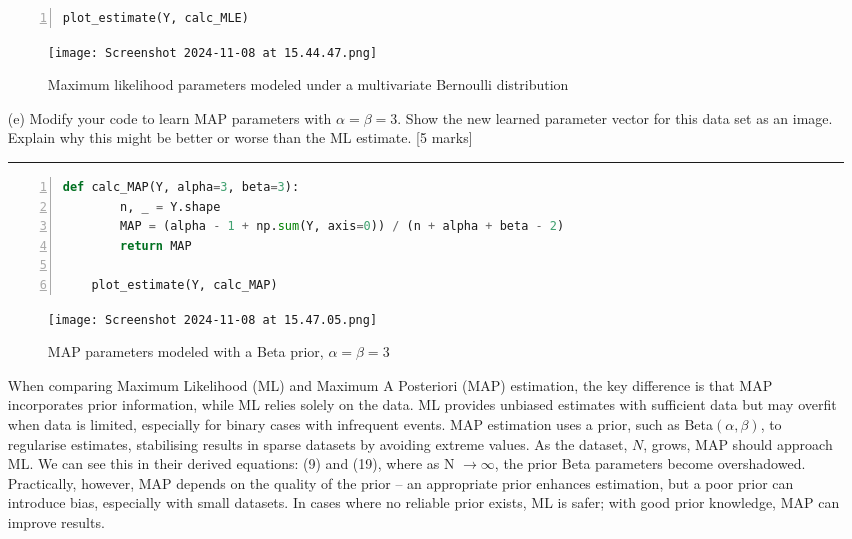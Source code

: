 \documentclass{article}
\begin{document}
\begin{enumerate}
\begin{lstlisting}[language=Python, numbers=left, frame=single, breaklines=true]
    plot_estimate(Y, calc_MLE)
    \end{lstlisting}



    \begin{figure}[H]
        \centering
        \texttt{[image: Screenshot 2024-11-08 at 15.44.47.png]}
        \caption{Maximum likelihood parameters modeled under a multivariate Bernoulli distribution}
        \label{fig:enter-label}
    \end{figure}

    \item[(e)] Modify your code to learn MAP parameters with $\alpha = \beta = 3$. Show the new learned parameter vector for this data set as an image. Explain why this might be better or worse than the ML estimate. [5 marks]

    \noindent\textcolor{gray}{\rule{0.1\linewidth}{0.4pt}}

    \vspace{10pt}


    \begin{lstlisting}[language=Python, numbers=left, frame=single, breaklines=true]
    def calc_MAP(Y, alpha=3, beta=3):
        n, _ = Y.shape
        MAP = (alpha - 1 + np.sum(Y, axis=0)) / (n + alpha + beta - 2)
        return MAP
    
    plot_estimate(Y, calc_MAP)
    \end{lstlisting}


    
    \begin{figure}[H]
        \centering
        \texttt{[image: Screenshot 2024-11-08 at 15.47.05.png]}
        \caption{MAP parameters modeled with a Beta prior, $\alpha = \beta = 3$}
        \label{fig:enter-label}
    \end{figure}

    When comparing Maximum Likelihood (ML) and Maximum A Posteriori (MAP) estimation, the key difference is that MAP incorporates prior information, while ML relies solely on the data. ML provides unbiased estimates with sufficient data but may overfit when data is limited, especially for binary cases with infrequent events. MAP estimation uses a prior, such as Beta$(\alpha,\beta)$, to regularise estimates, stabilising results in sparse datasets by avoiding extreme values. As the dataset, $N$, grows, MAP should approach ML. We can see this in their derived equations: (9) and (19), where as N $\to \infty$, the prior Beta parameters become overshadowed. Practically, however, MAP depends on the quality of the prior – an appropriate prior enhances estimation, but a poor prior can introduce bias, especially with small datasets. In cases where no reliable prior exists, ML is safer; with good prior knowledge, MAP can improve results.
        
    \end{enumerate}
    
\end{document}
